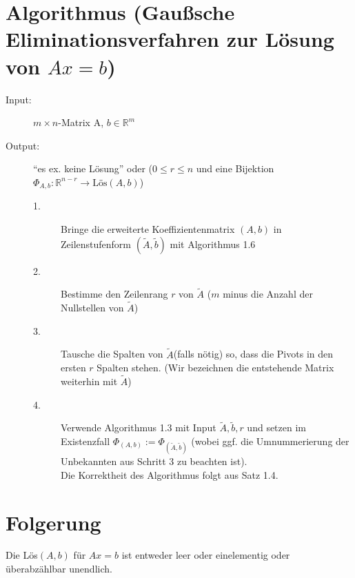 \documentclass{scrbook}
\begin{document}
\section{Algorithmus (Gaußsche Eliminationsverfahren zur Lösung von \(Ax=b\))}
\begin{description}
\item[Input:]
\(m\times n\)-Matrix A, \(b \in \mathbb{R}^m\)\\
\item[Output:]
"`es ex. keine Lösung"' oder (\(0\leq r \leq n\) und eine Bijektion \(\Phi_{A,b}:\mathbb{R}^{n-r}\rightarrow \text{Lös}(A,b)\))\\
\begin{description}
\item[1.]
Bringe die erweiterte Koeffizientenmatrix \((A,b)\) in Zeilenstufenform \((\tilde{A},\tilde{b})\) mit Algorithmus 1.6
\item[2.]
Bestimme den Zeilenrang $r$ von \(\tilde{A}\) ($m$ minus die Anzahl der Nullstellen von \(\tilde{A}\))
\item[3.]
Tausche die Spalten von \(\tilde{A}\)(falls nötig) so, dass die Pivots in den ersten $r$ Spalten stehen. (Wir bezeichnen die entstehende Matrix weiterhin mit \(\tilde{A}\))
\item[4.]
Verwende Algorithmus 1.3 mit Input \(\tilde{A},\tilde{b},r\) und setzen im Existenzfall \(\Phi_{(A,b)}:=\Phi_{(\tilde{A},\tilde{b})}\) (wobei ggf. die Umnummerierung der Unbekannten aus Schritt 3 zu beachten ist).\\
Die Korrektheit des Algorithmus folgt aus Satz 1.4.
\end{description}
\end{description}
\section{Folgerung}
Die Lös\((A,b)\) für \(Ax=b\) ist entweder leer oder einelementig oder überabzählbar unendlich.
\end{document}
